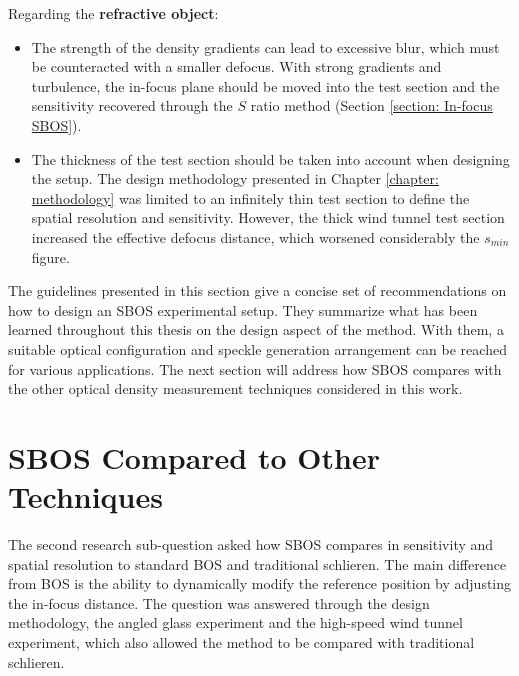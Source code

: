 Regarding the \textbf{refractive object}:

\begin{itemize}
    \item The strength of the density gradients can lead to excessive blur, which must be counteracted with a smaller defocus. With strong gradients and turbulence, the in-focus plane should be moved into the test section and the sensitivity recovered through the $S$ ratio method (Section \ref{section: In-focus SBOS}).

    \item The thickness of the test section should be taken into account when designing the setup. The design methodology presented in Chapter \ref{chapter: methodology} was limited to an infinitely thin test section to define the spatial resolution and sensitivity. However, the thick wind tunnel test section increased the effective defocus distance, which worsened considerably the $s_{min}$ figure.

\end{itemize}

The guidelines presented in this section give a concise set of recommendations on how to design an SBOS experimental setup. They summarize what has been learned throughout this thesis on the design aspect of the method. With them, a suitable optical configuration and speckle generation arrangement can be reached for various applications. The next section will address how SBOS compares with the other optical density measurement techniques considered in this work.

\section{SBOS Compared to Other Techniques}
\label{section: SBOS versus other techniques}

The second research sub-question asked how SBOS compares in sensitivity and spatial resolution to standard BOS and traditional schlieren. The main difference from BOS is the ability to dynamically modify the reference position by adjusting the in-focus distance. The question was answered through the design methodology, the angled glass experiment and the high-speed wind tunnel experiment, which also allowed the method to be compared with traditional schlieren.

